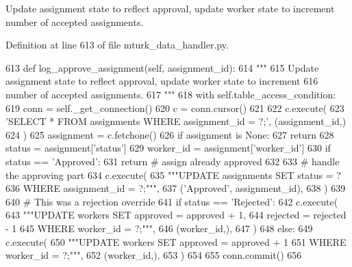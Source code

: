 \begin{DoxyVerb}Update assignment state to reflect approval, update worker state to increment
number of accepted assignments.
\end{DoxyVerb}
 

Definition at line 613 of file mturk\+\_\+data\+\_\+handler.\+py.


\begin{DoxyCode}
613     \textcolor{keyword}{def }log\_approve\_assignment(self, assignment\_id):
614         \textcolor{stringliteral}{"""}
615 \textcolor{stringliteral}{        Update assignment state to reflect approval, update worker state to increment}
616 \textcolor{stringliteral}{        number of accepted assignments.}
617 \textcolor{stringliteral}{        """}
618         with self.table\_access\_condition:
619             conn = self.\_get\_connection()
620             c = conn.cursor()
621 
622             c.execute(
623                 \textcolor{stringliteral}{'SELECT * FROM assignments WHERE assignment\_id = ?;'}, (assignment\_id,)
624             )
625             assignment = c.fetchone()
626             \textcolor{keywordflow}{if} assignment \textcolor{keywordflow}{is} \textcolor{keywordtype}{None}:
627                 \textcolor{keywordflow}{return}
628             status = assignment[\textcolor{stringliteral}{'status'}]
629             worker\_id = assignment[\textcolor{stringliteral}{'worker\_id'}]
630             \textcolor{keywordflow}{if} status == \textcolor{stringliteral}{'Approved'}:
631                 \textcolor{keywordflow}{return}  \textcolor{comment}{# assign already approved}
632 
633             \textcolor{comment}{# handle the approving part}
634             c.execute(
635                 \textcolor{stringliteral}{"""UPDATE assignments SET status = ?}
636 \textcolor{stringliteral}{                         WHERE assignment\_id = ?;"""},
637                 (\textcolor{stringliteral}{'Approved'}, assignment\_id),
638             )
639 
640             \textcolor{comment}{# This was a rejection override}
641             \textcolor{keywordflow}{if} status == \textcolor{stringliteral}{'Rejected'}:
642                 c.execute(
643                     \textcolor{stringliteral}{"""UPDATE workers SET approved = approved + 1,}
644 \textcolor{stringliteral}{                             rejected = rejected - 1}
645 \textcolor{stringliteral}{                             WHERE worker\_id = ?;"""},
646                     (worker\_id,),
647                 )
648             \textcolor{keywordflow}{else}:
649                 c.execute(
650                     \textcolor{stringliteral}{"""UPDATE workers SET approved = approved + 1}
651 \textcolor{stringliteral}{                             WHERE worker\_id = ?;"""},
652                     (worker\_id,),
653                 )
654 
655             conn.commit()
656 
\end{DoxyCode}
